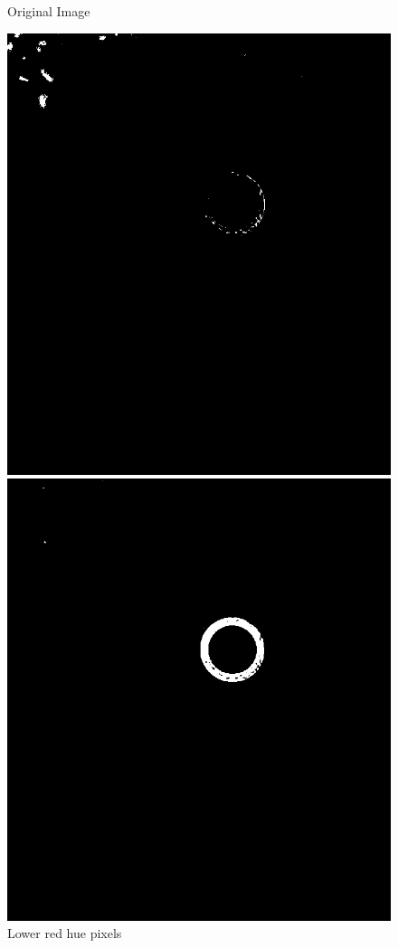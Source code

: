 \begin{figure}[H]
	\caption{Original Image}\label{fig:original_image}
	\endminipage\hfill
	\includegraphics[width=\linewidth]{images/lowerred.png}
	\caption{Lower red hue pixels}\label{fig:lower_red}
	\endminipage\hfill
	\includegraphics[width=\linewidth]{images/upperred.png}

\end{figure}
